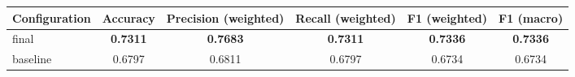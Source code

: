 \begin{tabular}{lccccc}
\hline
Configuration & Accuracy & Precision (weighted) & Recall (weighted) & F1 (weighted) & F1 (macro) \\
\hline
final & \textbf{0.7311} & \textbf{0.7683} & \textbf{0.7311} & \textbf{0.7336} & \textbf{0.7336} \\
baseline & 0.6797 & 0.6811 & 0.6797 & 0.6734 & 0.6734 \\
\hline
\end{tabular}
